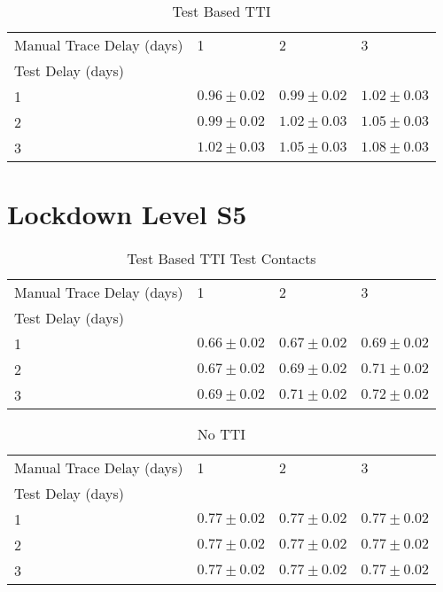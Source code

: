 \documentclass{article}
\begin{document}
    \begin{table}[H]
         \begin{tabular}{llll}
\toprule
Manual Trace Delay (days) &                1 &                2 &                3 \\
Test Delay (days) &                  &                  &                  \\
\midrule
1                 &  $0.96 \pm 0.02$ &  $0.99 \pm 0.02$ &  $1.02 \pm 0.03$ \\
2                 &  $0.99 \pm 0.02$ &  $1.02 \pm 0.03$ &  $1.05 \pm 0.03$ \\
3                 &  $1.02 \pm 0.03$ &  $1.05 \pm 0.03$ &  $1.08 \pm 0.03$ \\
\bottomrule
\end{tabular}

        \caption{Test Based TTI}
    \end{table}
    

\clearpage

\section{Lockdown Level S5}


    \begin{table}[H]
         \begin{tabular}{llll}
\toprule
Manual Trace Delay (days) &                1 &                2 &                3 \\
Test Delay (days) &                  &                  &                  \\
\midrule
1                 &  $0.66 \pm 0.02$ &  $0.67 \pm 0.02$ &  $0.69 \pm 0.02$ \\
2                 &  $0.67 \pm 0.02$ &  $0.69 \pm 0.02$ &  $0.71 \pm 0.02$ \\
3                 &  $0.69 \pm 0.02$ &  $0.71 \pm 0.02$ &  $0.72 \pm 0.02$ \\
\bottomrule
\end{tabular}

        \caption{Test Based TTI Test Contacts}
    \end{table}
    


    \begin{table}[H]
         \begin{tabular}{llll}
\toprule
Manual Trace Delay (days) &                1 &                2 &                3 \\
Test Delay (days) &                  &                  &                  \\
\midrule
1                 &  $0.77 \pm 0.02$ &  $0.77 \pm 0.02$ &  $0.77 \pm 0.02$ \\
2                 &  $0.77 \pm 0.02$ &  $0.77 \pm 0.02$ &  $0.77 \pm 0.02$ \\
3                 &  $0.77 \pm 0.02$ &  $0.77 \pm 0.02$ &  $0.77 \pm 0.02$ \\
\bottomrule
\end{tabular}

        \caption{No TTI}
    \end{table}
    
\end{document}
